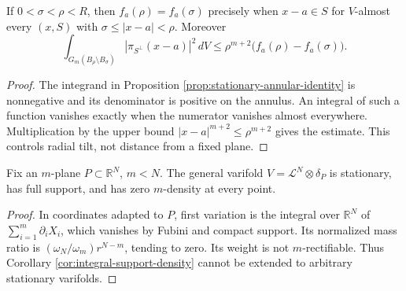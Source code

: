 \begin{corollary}\label{cor:stationary-radial-equality}
If $0<\sigma<\rho<R$, then $f_a(\rho)=f_a(\sigma)$ precisely when $x-a\in S$ for $V$-almost every $(x,S)$ with $\sigma\leq|x-a|<\rho$. Moreover
\[
 \int_{G_m(B_\rho\setminus B_\sigma)}|\pi_{S^\perp}(x-a)|^2\,dV
 \leq\rho^{m+2}\bigl(f_a(\rho)-f_a(\sigma)\bigr).
\]
\end{corollary}
\begin{proof}
The integrand in Proposition \ref{prop:stationary-annular-identity} is nonnegative and its denominator is positive on the annulus. An integral of such a function vanishes exactly when the numerator vanishes almost everywhere. Multiplication by the upper bound $|x-a|^{m+2}\leq\rho^{m+2}$ gives the estimate. This controls radial tilt, not distance from a fixed plane.
\end{proof}

\begin{example}\label{ex:diffuse-stationary-varifold}
Fix an $m$-plane $P\subset\mathbb R^N$, $m<N$. The general varifold $V=\mathcal L^N\otimes\delta_P$ is stationary, has full support, and has zero $m$-density at every point.
\end{example}
\begin{proof}
In coordinates adapted to $P$, first variation is the integral over $\mathbb R^N$ of $\sum_{i=1}^m\partial_iX_i$, which vanishes by Fubini and compact support. Its normalized mass ratio is $(\omega_N/\omega_m)r^{N-m}$, tending to zero. Its weight is not $m$-rectifiable. Thus Corollary \ref{cor:integral-support-density} cannot be extended to arbitrary stationary varifolds.
\end{proof}


